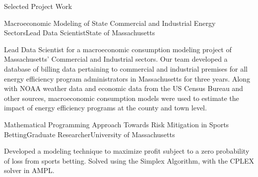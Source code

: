 \documentclass{resume} %
\begin{document}
\begin{rSection}{Selected Project Work}
\begin{rSubsection}{Macroeconomic Modeling of State Commercial and Industrial Energy Sectors}{}{Lead Data Scientist}{State of Massachusetts}
\item[] Lead Data Scientist for a macroeconomic consumption modeling project of Massachusetts' Commercial and Industrial sectors. Our team developed a database of billing data pertaining to commercial and industrial premises for all energy efficiency program administrators in Massachusetts for three years. Along with NOAA weather data and economic data from the US Census Bureau and other sources, macroeconomic consumption models were used to estimate the impact of energy efficiency programs at the county and town level.
\end{rSubsection}

\begin{rSubsection}{Mathematical Programming Approach Towards Risk Mitigation in Sports Betting}{}{Graduate Researcher}{University of Massachusetts}
\item[] Developed a modeling technique to maximize profit subject to a zero probability of loss from sports betting. Solved using the Simplex Algorithm, with the CPLEX solver in AMPL.
\end{rSubsection}

\end{rSection}

\pagebreak

\end{document}
